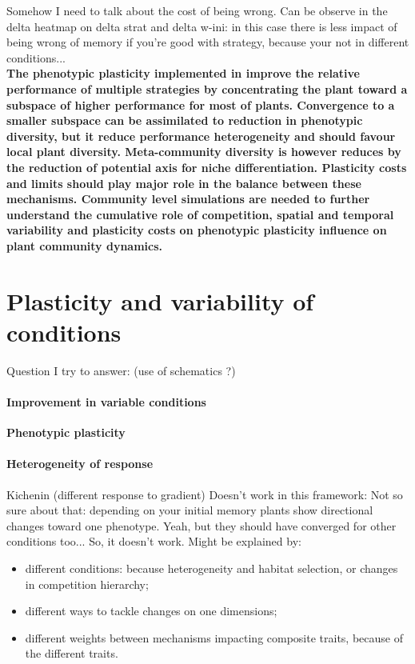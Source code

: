 Somehow I need to talk about the cost of being wrong. Can be observe in the delta heatmap on delta strat and delta w-ini: in this case there is less impact of being wrong of memory if you're good with strategy, because your not in different conditions...\\

\textbf{The phenotypic plasticity implemented in \model improve the relative performance of multiple strategies by concentrating the plant toward a subspace of higher performance for most of plants. Convergence to a smaller subspace can be assimilated to reduction in phenotypic diversity, but it reduce performance heterogeneity and should favour local plant diversity. Meta-community diversity is however reduces by the reduction of potential axis for niche differentiation. Plasticity costs and limits should play major role in the balance between these mechanisms. Community level simulations are needed to further understand the cumulative role of competition, spatial and temporal variability and plasticity costs on phenotypic plasticity influence on plant community dynamics.}


\section{Plasticity and variability of conditions}
Question I try to answer: (use of schematics ?)

\paragraph{Improvement in variable conditions}

\textbf{Phenotypic plasticity }

\paragraph{Heterogeneity of response}

Kichenin (different response to gradient) Doesn't work in this framework: Not so sure about that: depending on your initial memory plants show directional changes toward one phenotype. Yeah, but they should have converged for other conditions too... So, it doesn't work. Might be explained by:
\begin{itemize}
\item different conditions: because heterogeneity and habitat selection, or changes in competition hierarchy;
\item different ways to tackle changes on one dimensions;
\item different weights between mechanisms impacting composite traits, because of the different traits.
\end{itemize}

